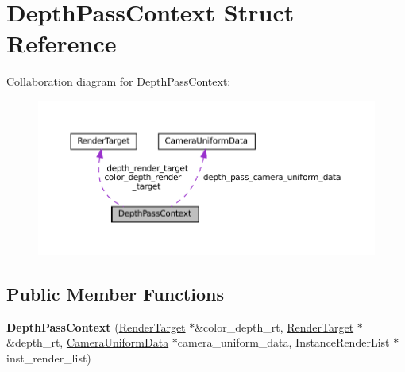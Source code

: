\hypertarget{structDepthPassContext}{}\section{Depth\+Pass\+Context Struct Reference}
\label{structDepthPassContext}


Collaboration diagram for Depth\+Pass\+Context\+:
\nopagebreak
\begin{figure}[H]
\begin{center}
\leavevmode
\includegraphics[width=350pt]{structDepthPassContext__coll__graph}
\end{center}
\end{figure}
\subsection*{Public Member Functions}
\begin{DoxyCompactItemize}
\item 
\mbox{\label{structDepthPassContext_acaebe13a776f081e1416ec25e33c3908}} 
{\bfseries Depth\+Pass\+Context} (\hyperlink{classRenderTarget}{Render\+Target} $\ast$\&color\+\_\+depth\+\_\+rt, \hyperlink{classRenderTarget}{Render\+Target} $\ast$\&depth\+\_\+rt, \hyperlink{structCameraUniformData}{Camera\+Uniform\+Data} $\ast$camera\+\_\+uniform\+\_\+data, Instance\+Render\+List $\ast$inst\+\_\+render\+\_\+list)
\end{DoxyCompactItemize}
